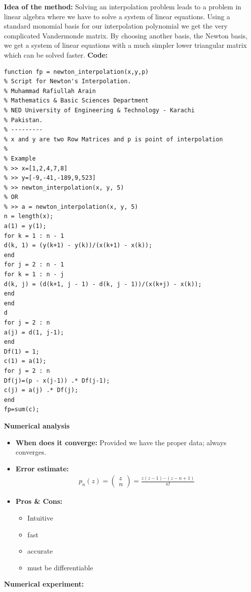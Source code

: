 \documentclass{article}
\begin{document}
	{\bf Idea of the method:} 
Solving an interpolation problem leads to a problem in linear algebra where we have to solve a system of linear equations. Using a standard monomial basis for our interpolation polynomial we get the very complicated Vandermonde matrix. By choosing another basis, the Newton basis, we get a system of linear equations with a much simpler lower triangular matrix which can be solved faster.
	{\bf Code:}
	\begin{verbatim}
function fp = newton_interpolation(x,y,p)
% Script for Newton's Interpolation.
% Muhammad Rafiullah Arain
% Mathematics & Basic Sciences Department
% NED University of Engineering & Technology - Karachi
% Pakistan.
% ---------
% x and y are two Row Matrices and p is point of interpolation
%
% Example
% >> x=[1,2,4,7,8]
% >> y=[-9,-41,-189,9,523]
% >> newton_interpolation(x, y, 5)
% OR
% >> a = newton_interpolation(x, y, 5)
n = length(x);
a(1) = y(1);
for k = 1 : n - 1
d(k, 1) = (y(k+1) - y(k))/(x(k+1) - x(k));
end
for j = 2 : n - 1
for k = 1 : n - j
d(k, j) = (d(k+1, j - 1) - d(k, j - 1))/(x(k+j) - x(k));
end
end
d
for j = 2 : n
a(j) = d(1, j-1);
end
Df(1) = 1;
c(1) = a(1);
for j = 2 : n
Df(j)=(p - x(j-1)) .* Df(j-1);
c(j) = a(j) .* Df(j);
end
fp=sum(c);

	\end{verbatim}
	{\bf Numerical analysis}
	\begin{itemize}
		\item{\bf When does it converge:} Provided we have the proper data; always converges.
		\item {\bf Error estimate:}
		\begin{equation}
		\begin{split}
		& p _ { n } ( z ) = \left( \begin{array} { l } { z } \\ { n } \end{array} \right) = \frac { z ( z - 1 ) \cdots ( z - n + 1 ) } { n ! }
		\end{split}
		\end{equation}
		\item {\bf Pros \& Cons:}
		\begin{itemize}
			\item Intuitive
			\item fast
			\item accurate
			\item must be differentiable
		\end{itemize}
	\end{itemize}
	{\bf Numerical experiment:}
\end{document}
